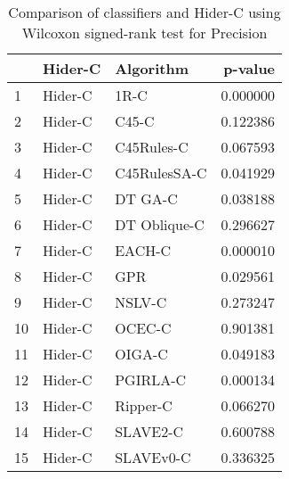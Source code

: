 \begin{table}
\footnotesize
\caption{Comparison of classifiers and Hider-C using Wilcoxon signed-rank test for Precision}
\label{tab:Hider-C wilcoxon Precision comparison}
\begin{tabular}{lllr}
\hline
 & Hider-C & Algorithm & p-value \\
\hline
1 & Hider-C & 1R-C & 0.000000 \\
2 & Hider-C & C45-C & 0.122386 \\
3 & Hider-C & C45Rules-C & 0.067593 \\
4 & Hider-C & C45RulesSA-C & 0.041929 \\
5 & Hider-C & DT GA-C & 0.038188 \\
6 & Hider-C & DT Oblique-C & 0.296627 \\
7 & Hider-C & EACH-C & 0.000010 \\
8 & Hider-C & GPR & 0.029561 \\
9 & Hider-C & NSLV-C & 0.273247 \\
10 & Hider-C & OCEC-C & 0.901381 \\
11 & Hider-C & OIGA-C & 0.049183 \\
12 & Hider-C & PGIRLA-C & 0.000134 \\
13 & Hider-C & Ripper-C & 0.066270 \\
14 & Hider-C & SLAVE2-C & 0.600788 \\
15 & Hider-C & SLAVEv0-C & 0.336325 \\
\hline
\end{tabular}
\end{table}
